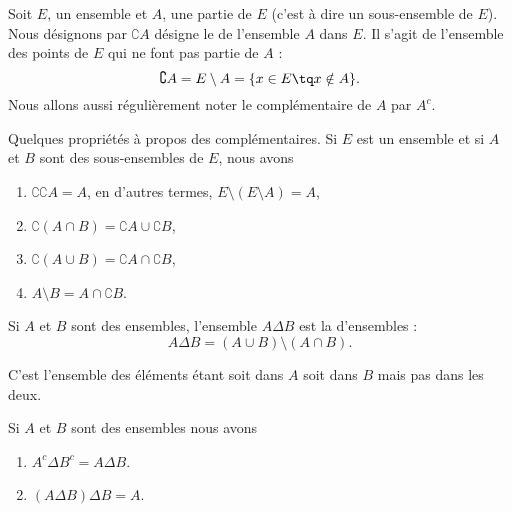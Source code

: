Soit $E$, un ensemble et $A$, une partie de $E$ (c'est à dire un sous-ensemble de $E$). Nous désignons par $\complement A$ désigne le  de l'ensemble $A$ dans $E$. Il s'agit de l'ensemble des points de $E$ qui ne font pas partie de $A$ :
\begin{equation}
	\complement A=E\setminus A=\{ x\in E\tq x\notin A \}.
\end{equation}
Nous allons aussi régulièrement noter le complémentaire de \( A\) par \( A^c\).

\begin{lemma}		\label{LemPropsComplement}
	Quelques propriétés à propos des complémentaires. Si $E$ est un ensemble et si $A$ et $B$ sont des sous-ensembles de $E$, nous avons
	\begin{enumerate}
		\item
			$\complement \complement A =A $, en d'autres termes, $E\setminus(E\setminus A)=A$,
		\item
			$\complement(A\cap B)=\complement A\cup\complement B$,
		\item
			$\complement(A\cup B)=\complement A\cap\complement B$,
		\item	\label{ItemLemPropComplementiii}
			$A\setminus B=A\cap\complement B$.
	\end{enumerate}
\end{lemma}

\begin{definition}    \label{DefBMLooVjlSG}
    Si \( A\) et \( B\) sont des ensembles, l'ensemble \( A\Delta B\) est la  d'ensembles : 
    \begin{equation}
        A\Delta B=(A\cup B)\setminus(A\cap B).
    \end{equation}
\end{definition}
C'est l'ensemble des éléments étant soit dans \( A\) soit dans \( B\) mais pas dans les deux.

\begin{lemma}   \label{LemCUVoohKpWB}
    Si \( A\) et \( B\) sont des ensembles nous avons
    \begin{enumerate}
        \item\label{ItemVUCooHAztC}
            \( A^c\Delta B^c=A\Delta B\).
        \item\label{ItemVUCooHAztCii}
            \( (A\Delta B)\Delta B=A\).
    \end{enumerate}
\end{lemma}

